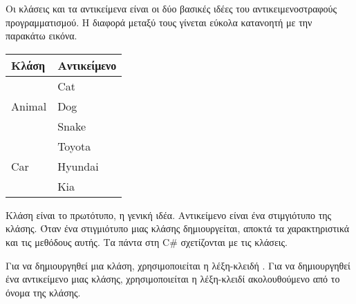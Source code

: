 Οι κλάσεις και τα αντικείμενα είναι οι δύο βασικές ιδέες του αντικειμενοστραφούς προγραμματισμού. Η διαφορά μεταξύ τους γίνεται εύκολα κατανοητή με την παρακάτω εικόνα.

\begin{table}[h]
    \centering
    \small{
    \begin{tabular}{|l|l|}
        \hline
        \textbf{Κλάση} & \textbf{Αντικείμενο} \\ \hline
        \multirow{3}{*}{Animal} & Cat \\ \cline{2-2}
        & Dog \\ \cline{2-2}
        & Snake \\ \hline
        \multirow{3}{*}{Car} & Toyota \\ \cline{2-2}
        & Hyundai \\ \cline{2-2}
        & Kia \\ \hline
    \end{tabular}
    }
    \label{tab:my_label}
\end{table}

Κλάση είναι το πρωτότυπο, η γενική ιδέα. Αντικείμενο είναι ένα στιμγιότυπο της κλάσης. Όταν ένα στιγμιότυπο μιας κλάσης δημιουργείται, αποκτά τα χαρακτηριστικά και τις μεθόδους αυτής. Τα πάντα στη C\# σχετίζονται με τις κλάσεις.

Για να δημιουργηθεί μια κλάση, χρησιμοποιείται η λέξη-κλειδή . Για να δημιουργηθεί ένα αντικείμενο μιας κλάσης, χρησιμοποιείται η λέξη-κλειδί  ακολουθούμενο από το όνομα της κλάσης.

